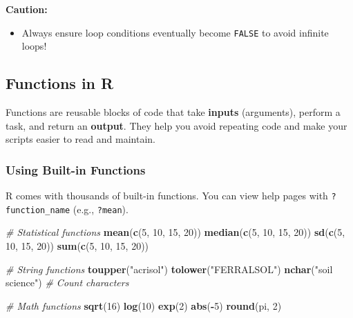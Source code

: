 \documentclass[
  10pt,
  b5paper,
  oneside]{book}
\newenvironment{Shaded}{\begin{snugshade}}{\end{snugshade}}
\newcommand{\CommentTok}[1]{\textcolor[rgb]{0.56,0.35,0.01}{\textit{#1}}}
\newcommand{\DecValTok}[1]{\textcolor[rgb]{0.00,0.00,0.81}{#1}}
\newcommand{\FunctionTok}[1]{\textcolor[rgb]{0.13,0.29,0.53}{\textbf{#1}}}
\newcommand{\NormalTok}[1]{#1}
\newcommand{\SpecialCharTok}[1]{\textcolor[rgb]{0.81,0.36,0.00}{\textbf{#1}}}
\newcommand{\StringTok}[1]{\textcolor[rgb]{0.31,0.60,0.02}{#1}}
\providecommand{\tightlist}{%
  \setlength{\itemsep}{0pt}\setlength{\parskip}{0pt}}
\begin{document}
\textbf{Caution:}

\begin{itemize}
\tightlist
\item
  Always ensure loop conditions eventually become \texttt{FALSE} to avoid infinite loops!
\end{itemize}

\subsection{Functions in R}\label{r-funtions}

Functions are reusable blocks of code that take \textbf{inputs} (arguments), perform a task, and return an \textbf{output}. They help you avoid repeating code and make your scripts easier to read and maintain.

\subsubsection{Using Built-in Functions}\label{built-funtions}

R comes with thousands of built-in functions. You can view help pages with \texttt{?function\_name} (e.g., \texttt{?mean}).

\begin{Shaded}
\begin{Highlighting}[]
\CommentTok{\# Statistical functions}
\FunctionTok{mean}\NormalTok{(}\FunctionTok{c}\NormalTok{(}\DecValTok{5}\NormalTok{, }\DecValTok{10}\NormalTok{, }\DecValTok{15}\NormalTok{, }\DecValTok{20}\NormalTok{))}
\FunctionTok{median}\NormalTok{(}\FunctionTok{c}\NormalTok{(}\DecValTok{5}\NormalTok{, }\DecValTok{10}\NormalTok{, }\DecValTok{15}\NormalTok{, }\DecValTok{20}\NormalTok{))}
\FunctionTok{sd}\NormalTok{(}\FunctionTok{c}\NormalTok{(}\DecValTok{5}\NormalTok{, }\DecValTok{10}\NormalTok{, }\DecValTok{15}\NormalTok{, }\DecValTok{20}\NormalTok{))}
\FunctionTok{sum}\NormalTok{(}\FunctionTok{c}\NormalTok{(}\DecValTok{5}\NormalTok{, }\DecValTok{10}\NormalTok{, }\DecValTok{15}\NormalTok{, }\DecValTok{20}\NormalTok{))}

\CommentTok{\# String functions}
\FunctionTok{toupper}\NormalTok{(}\StringTok{"acrisol"}\NormalTok{)}
\FunctionTok{tolower}\NormalTok{(}\StringTok{"FERRALSOL"}\NormalTok{)}
\FunctionTok{nchar}\NormalTok{(}\StringTok{"soil science"}\NormalTok{)         }\CommentTok{\# Count characters}

\CommentTok{\# Math functions}
\FunctionTok{sqrt}\NormalTok{(}\DecValTok{16}\NormalTok{)}
\FunctionTok{log}\NormalTok{(}\DecValTok{10}\NormalTok{)}
\FunctionTok{exp}\NormalTok{(}\DecValTok{2}\NormalTok{)}
\FunctionTok{abs}\NormalTok{(}\SpecialCharTok{{-}}\DecValTok{5}\NormalTok{)}
\FunctionTok{round}\NormalTok{(pi, }\DecValTok{2}\NormalTok{)}
\end{Highlighting}
\end{Shaded}
\end{document}

